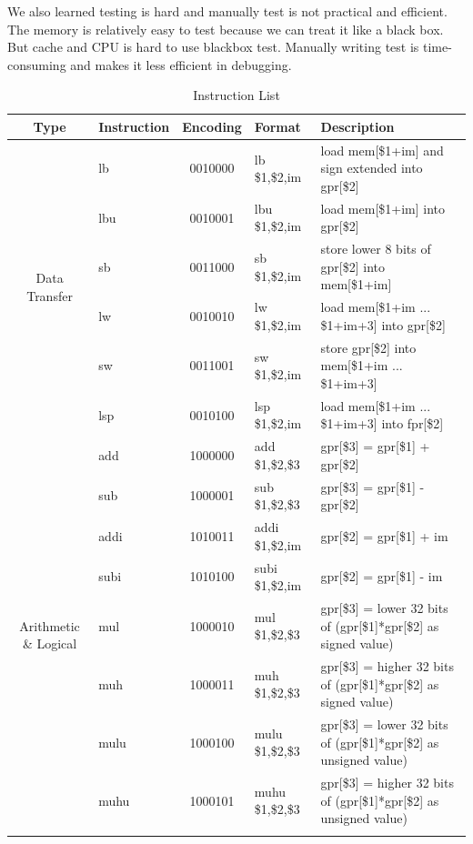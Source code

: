 \documentclass{sig-alternate}
\begin{document}
We also learned testing is hard and manually test is not practical and efficient. The memory is relatively easy to test because we can treat it like a black box. But cache and CPU is hard to use blackbox test. Manually writing test is time-consuming and makes it less efficient in debugging.

\begin{table}[p]
\caption{Instruction List}
\label{tab:il}
\centering
\begin{tabular}{|c|l|c|l|p{8cm}|}
\hline
Type & Instruction & Encoding & Format & Description \\
 \hline
\multirow{6}{*}{Data Transfer} & lb & 0010000 & lb \$1,\$2,im & load mem[\$1+im] and sign extended into gpr[\$2] \\ \cline{2-5}
 & lbu & 0010001 & lbu \$1,\$2,im & load mem[\$1+im] into gpr[\$2] \\ \cline{2-5}
 & sb & 0011000 & sb \$1,\$2,im & store lower 8 bits of gpr[\$2] into mem[\$1+im] \\ \cline{2-5}
 & lw & 0010010 & lw \$1,\$2,im & load mem[\$1+im ... \$1+im+3] into gpr[\$2]\\ \cline{2-5}
 & sw & 0011001 & sw \$1,\$2,im & store gpr[\$2] into mem[\$1+im ... \$1+im+3]\\ \cline{2-5}
 & lsp & 0010100 & lsp \$1,\$2,im & load mem[\$1+im ... \$1+im+3] into fpr[\$2] \\ \hline
\multirow{23}{*}{Arithmetic \& Logical} & add & 1000000 & add \$1,\$2,\$3 & gpr[\$3] = gpr[\$1] + gpr[\$2] \\ \cline{2-5}
 & sub & 1000001 & sub \$1,\$2,\$3& gpr[\$3] = gpr[\$1] - gpr[\$2] \\ \cline{2-5}  
 & addi & 1010011 & addi \$1,\$2,im & gpr[\$2] = gpr[\$1] + im \\ \cline{2-5}
 & subi & 1010100 & subi \$1,\$2,im &  gpr[\$2] = gpr[\$1] - im \\ \cline{2-5}
 & mul & 1000010 & mul \$1,\$2,\$3 & gpr[\$3] = lower 32 bits of (gpr[\$1]*gpr[\$2] as signed value) \\ \cline{2-5}
 & muh & 1000011 & muh \$1,\$2,\$3 & gpr[\$3] = higher 32 bits of (gpr[\$1]*gpr[\$2] as signed value) \\ \cline{2-5}
 & mulu & 1000100 & mulu \$1,\$2,\$3 & gpr[\$3] = lower 32 bits of (gpr[\$1]*gpr[\$2] as unsigned value) \\ \cline{2-5}  
 & muhu & 1000101 & muhu \$1,\$2,\$3 &  gpr[\$3] = higher 32 bits of (gpr[\$1]*gpr[\$2] as unsigned value) \\ \cline{2-5}

\end{tabular}
\end{table}
\end{document}
